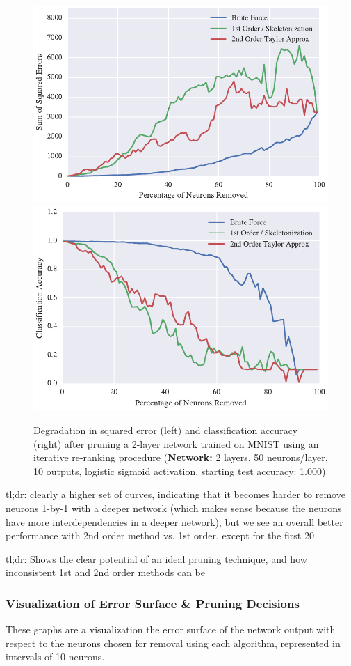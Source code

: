\begin{figure}
\centering
\includegraphics[width=0.49\linewidth]{png/mnist-deep-iterative-rerank-method.pdf}
\includegraphics[width=0.49\linewidth]{png/mnist-deep-iterative-rerank-accuracy.pdf}
\caption{Degradation in squared error (left) and classification accuracy (right) after pruning a 2-layer network trained on MNIST using an iterative re-ranking procedure (\textbf{Network:} 2 layers, 50 neurons/layer, 10 outputs, logistic sigmoid activation, starting test accuracy: 1.000)}
\label{fig:mnist-re-ranking-double-layer}
\end{figure}

tl;dr: clearly a higher set of curves, indicating that it becomes harder to remove neurons 1-by-1 with a deeper network (which makes sense because the neurons have more interdependencies in a deeper network), but we see an overall better performance with 2nd order method vs. 1st order, except for the first 20%

tl;dr: Shows the clear potential of an ideal pruning technique, and how inconsistent 1st and 2nd order methods can be

\subsubsection{Visualization of Error Surface \& Pruning Decisions}
These graphs are a visualization the error surface of the network output with respect to the neurons chosen for removal using each algorithm, represented in intervals of 10 neurons. 

